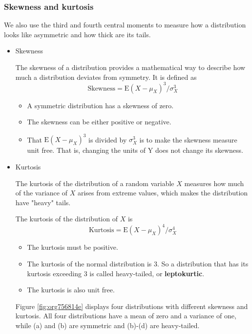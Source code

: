 \documentclass[a4paper,11pt]{article}
\begin{document}
\subsubsection*{Skewness and kurtosis}
\label{sec:org3ce42a0}

We also use the third and fourth central moments to measure how a
distribution looks like asymmetric and how thick are its tails.

\begin{itemize}
\item Skewness
\label{sec:orgb6f6979}

The skewness of a distribution provides a mathematical way to describe
how much a distribution deviates from symmetry. It is defined as
\[ \text{Skewness} =  \mathrm{E}(X - \mu_X)^{3}/\sigma_{X}^{3} \]

\begin{itemize}
\item A symmetric distribution has a skewness of zero.
\item The skewness can be either positive or negative.
\item That \(\mathrm{E}(X - \mu_X)^3\) is divided by \(\sigma^3_X\) is to make the
skewness measure unit free. That is, changing the units of Y does
not change its skewness.
\end{itemize}

\item Kurtosis
\label{sec:org5b17090}

The kurtosis of the distribution of a random variable \(X\) measures how
much of the variance of \(X\) arises from extreme values, which makes
the distribution have "heavy" tails.

The kurtosis of the distribution of \(X\) is
\[ \text{Kurtosis} = \mathrm{E}(X - \mu_X)^{4}/\sigma_{X}^{4} \]

\begin{itemize}
\item The kurtosis must be positive.
\item The kurtosis of the normal distribution is 3. So a distribution that
has its kurtosis exceeding 3 is called heavy-tailed, or
\textbf{leptokurtic}.
\item The kurtosis is also unit free.
\end{itemize}

Figure \ref{fig:org756814e} displays four distributions with different
skewness and kurtosis. All four distributions have a mean of zero and
a variance of one, while (a) and (b) are symmetric and (b)-(d) are
heavy-tailed.


\end{itemize}
\end{document}

